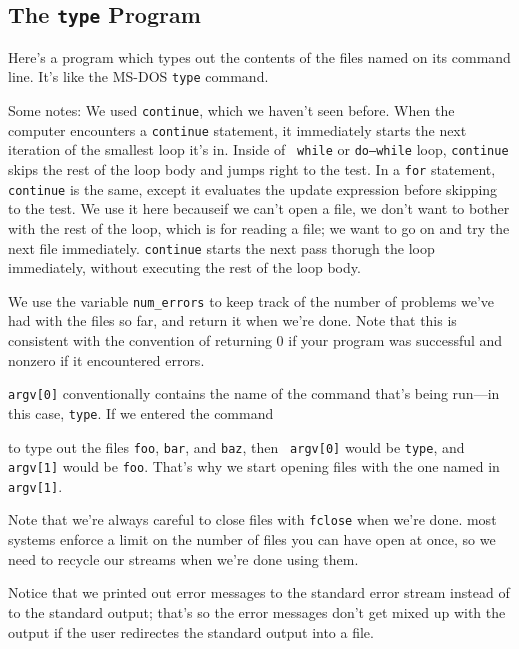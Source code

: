 \subsection{The {\tt type} Program}

Here's a program which types out the contents of the files named on its
command line.  It's like the MS-DOS {\tt type} command.



Some notes: We used {\tt continue}, which we haven't seen before.  When
the computer encounters a {\tt continue} statement, it immediately
starts the next iteration of the smallest loop it's in.  Inside of {\tt
while} or {\tt do{\rm--}while} loop, {\tt continue} skips the rest of
the loop body and jumps right to the test.  In a {\tt for} statement,
{\tt continue} is the same, except it evaluates the update expression
before skipping to the test.  We use it here becauseif we can't open a
file, we don't want to bother with the rest of the loop, which is for
reading a file; we want to go on and try the next file immediately.
{\tt continue} starts the next pass thorugh the loop immediately,
without executing the rest of the loop body.

We use the variable {\tt num\_errors} to keep track of the number of
problems we've had with the files so far, and return it when we're done.
Note that this is consistent with the convention of returning 0 if your
program was successful and nonzero if it encountered errors.  

{\tt argv[0]} conventionally contains the name of the command
that's being run---in this case, {\tt type}.  If we entered the command 
\begin{flushleft}
\verb% type foo bar baz% \\*
\end{flushleft}

\noindent to type out the files {\tt foo}, {\tt bar}, and {\tt baz}, then {\tt
argv[0]} would be {\tt type}, and {\tt argv[1]} would be {\tt foo}.
That's why we start opening files with the one named in {\tt argv[1]}.

Note that we're always careful to close files with {\tt fclose} when
we're done.  most systems enforce a limit on the number of files you can
have open at once, so we need to recycle our streams when we're done
using them.  

Notice that we printed out error messages to the standard error stream
instead of to the standard output; that's so the error messages don't
get mixed up with the output if the user redirectes the standard output
into a file.


